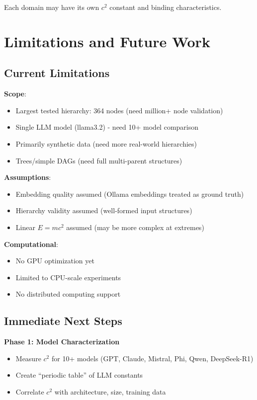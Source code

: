 \documentclass[11pt,a4paper]{article}
\begin{document}
Each domain may have its own $c^2$ constant and binding characteristics.

\section{Limitations and Future Work}

\subsection{Current Limitations}

\textbf{Scope}:
\begin{itemize}
    \item Largest tested hierarchy: 364 nodes (need million+ node validation)
    \item Single LLM model (llama3.2) - need 10+ model comparison
    \item Primarily synthetic data (need more real-world hierarchies)
    \item Trees/simple DAGs (need full multi-parent structures)
\end{itemize}

\textbf{Assumptions}:
\begin{itemize}
    \item Embedding quality assumed (Ollama embeddings treated as ground truth)
    \item Hierarchy validity assumed (well-formed input structures)
    \item Linear $E=mc^2$ assumed (may be more complex at extremes)
\end{itemize}

\textbf{Computational}:
\begin{itemize}
    \item No GPU optimization yet
    \item Limited to CPU-scale experiments
    \item No distributed computing support
\end{itemize}

\subsection{Immediate Next Steps}

\textbf{Phase 1: Model Characterization}
\begin{itemize}
    \item Measure $c^2$ for 10+ models (GPT, Claude, Mistral, Phi, Qwen, DeepSeek-R1)
    \item Create ``periodic table'' of LLM constants
    \item Correlate $c^2$ with architecture, size, training data
\end{itemize}
\end{document}
